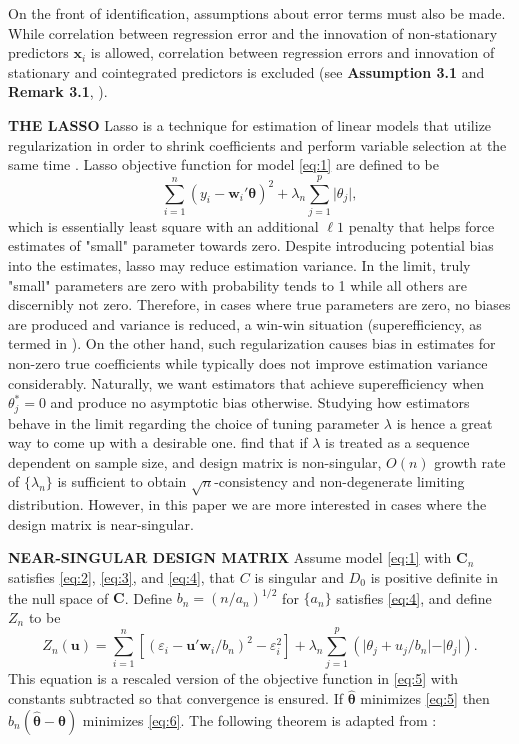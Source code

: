 \documentclass[12pt,a4paper]{article}
\DeclareMathOperator*{\argmin}{arg\,min} %
\begin{document}
On the front of identification, assumptions about error terms must also be made. While correlation between regression error and the innovation of non-stationary predictors $ \bm{x}_i $ is allowed, correlation between regression errors and innovation of stationary and cointegrated predictors is excluded (see \textbf{Assumption 3.1} and \textbf{Remark 3.1}, \cite{lee2018lasso}).


\textbf{THE LASSO}
Lasso is a technique for estimation of linear models that utilize regularization in order to shrink coefficients and perform variable selection at the same time \citep{tibshirani1996regression}. Lasso objective function for model \eqref{eq:1} are defined to be
\begin{equation}\label{eq:5}
	\sum_{i = 1}^n(y_i - \bm{w}_i'\bm{\theta})^2 + 
	\lambda_n\sum_{j = 1}^p\vert\theta_j\vert,
\end{equation}
which is essentially least square with an additional $ \ell1 $ penalty that helps force estimates of "small" parameter towards zero. Despite introducing potential bias into the estimates, lasso may reduce estimation variance. In the limit, truly "small" parameters are zero with probability tends to 1 while all others are discernibly not zero. Therefore, in cases where true parameters are zero, no biases are produced and variance is reduced, a win-win situation (superefficiency, as termed in \cite{knight2008shrinkage}). On the other hand, such regularization causes bias in estimates for non-zero true coefficients while typically does not improve estimation variance considerably. Naturally, we want estimators that achieve superefficiency when $ \theta^*_j = 0 $ and produce no asymptotic bias otherwise. Studying how estimators behave in the limit regarding the choice of tuning parameter $ \lambda $ is hence a great way to come up with a desirable one. 
\cite{knight2000asymptotics} find that if $ \lambda $ is treated as a sequence dependent on sample size, and design matrix is non-singular, $ O(n) $ growth rate of $ \{\lambda_n\} $ is sufficient to obtain $ \sqrt{n} $-consistency and non-degenerate limiting distribution. However, in this paper we are more interested in cases where the design matrix is near-singular.

\textbf{NEAR-SINGULAR DESIGN MATRIX}
Assume model \eqref{eq:1} with $ \bm{C}_n $ satisfies \eqref{eq:2}, \eqref{eq:3}, and \eqref{eq:4}, that $ C $ is singular and $ D_0 $ is positive definite in the null space of $ \bm{C} $. Define $ b_n = (n/a_n)^{1/2} $ for $ \{a_n\} $ satisfies \eqref{eq:4}, and define $ Z_n $ to be
\begin{equation}\label{eq:6}
	Z_n(\bm{u}) = 
	\sum_{i = 1}^n[(\varepsilon_i - \bm{u}'\bm{w}_i/b_n)^2 - \varepsilon_i^2] +
	\lambda_n\sum_{j = 1}^{p}(\vert\theta_j + u_j/b_n\vert - \vert\theta_j\vert).
\end{equation}
This equation is a rescaled version of the objective function in \eqref{eq:5} with constants subtracted so that convergence is ensured. If $ \hat{\bm{\theta}} $ minimizes \eqref{eq:5} then $ b_n(\hat{\bm{\theta}} - \bm{\theta}) $ minimizes \eqref{eq:6}. The following theorem is adapted from \cite{knight2000asymptotics}:
\end{document}
